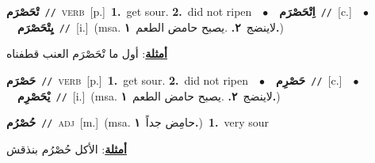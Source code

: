 \documentclass[10pt,a4paper,twoside]{article} %
\begin{document}
\begin{multicols}{2}
{\setlength\topsep{0pt}\textbf{\foreignlanguage{arabic}{تْحَصْرَم}}\ {\color{gray}\texttt{//}\color{black}}\ \textsc{verb}\ [p.]\ \textbf{1.}~get sour.  \textbf{2.}~did not ripen\ \ $\bullet$\ \ \setlength\topsep{0pt}\textbf{\foreignlanguage{arabic}{اِتْحَصْرَم}}\ {\color{gray}\texttt{//}\color{black}}\ [c.]\ \ $\bullet$\ \ \setlength\topsep{0pt}\textbf{\foreignlanguage{arabic}{يِتْحَصْرَم}}\ {\color{gray}\texttt{//}\color{black}}\ [i.]\ \color{gray}(msa. \foreignlanguage{arabic}{لاينضج}~\foreignlanguage{arabic}{\textbf{٢.}}  .\foreignlanguage{arabic}{يصبح حامض الطعم}~\foreignlanguage{arabic}{\textbf{١.}})\color{black}\  \begin{flushright}\color{gray}\foreignlanguage{arabic}{\textbf{\underline{\foreignlanguage{arabic}{أمثلة}}}: أول ما تْحَصْرَم العنب قطفناه}\end{flushright}\color{black}} \vspace{2mm}

{\setlength\topsep{0pt}\textbf{\foreignlanguage{arabic}{حَصْرَم}}\ {\color{gray}\texttt{//}\color{black}}\ \textsc{verb}\ [p.]\ \textbf{1.}~get sour.  \textbf{2.}~did not ripen\ \ $\bullet$\ \ \setlength\topsep{0pt}\textbf{\foreignlanguage{arabic}{حَصْرِم}}\ {\color{gray}\texttt{//}\color{black}}\ [c.]\ \ $\bullet$\ \ \setlength\topsep{0pt}\textbf{\foreignlanguage{arabic}{يْحَصْرِم}}\ {\color{gray}\texttt{//}\color{black}}\ [i.]\ \color{gray}(msa. \foreignlanguage{arabic}{لاينضج}~\foreignlanguage{arabic}{\textbf{٢.}}  .\foreignlanguage{arabic}{يصبح حامض الطعم}~\foreignlanguage{arabic}{\textbf{١.}})\color{black}\ } \vspace{2mm}

{\setlength\topsep{0pt}\textbf{\foreignlanguage{arabic}{حُصْرُم}}\ {\color{gray}\texttt{//}\color{black}}\ \textsc{adj}\ [m.]\ \color{gray}(msa. \foreignlanguage{arabic}{حامِض جداً}~\foreignlanguage{arabic}{\textbf{١.}})\color{black}\ \textbf{1.}~very sour\  \begin{flushright}\color{gray}\foreignlanguage{arabic}{\textbf{\underline{\foreignlanguage{arabic}{أمثلة}}}: الأكل حُصْرُم بنذقش}\end{flushright}\color{black}} \vspace{2mm}


\end{multicols}
\end{document}
